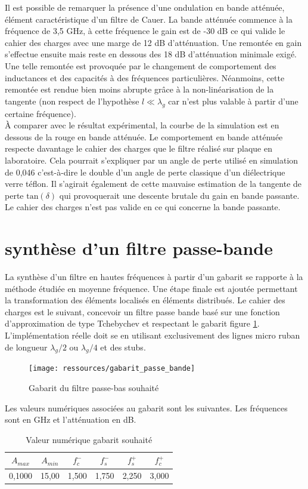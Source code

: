 \documentclass[french]{article}
\begin{document}
Il est possible de remarquer la présence d'une ondulation en bande atténuée, élément caractéristique d'un filtre de Cauer. La bande atténuée commence à la fréquence de 3,5 GHz, à cette fréquence le gain est de -30 dB ce qui valide le cahier des charges avec une marge de 12 dB d'atténuation. Une remontée en gain s'effectue ensuite mais reste en dessous des 18 dB d'atténuation minimale exigé. Une telle remontée est provoquée par le changement de comportement des inductances et des capacités à des fréquences particulières. Néanmoins, cette remontée est rendue bien moins abrupte grâce à la non-linéarisation de la tangente (non respect de l'hypothèse $l \ll \lambda_g$ car n'est plus valable à partir d'une certaine fréquence).\\
À comparer avec le résultat expérimental, la courbe de la simulation est en dessous de la rouge en bande atténuée. Le comportement en bande atténuée respecte davantage le cahier des charges que le filtre réalisé sur plaque en laboratoire. Cela pourrait s'expliquer par un angle de perte utilisé en simulation de 0,046 c'est-à-dire le double d'un angle de perte classique d'un diélectrique verre téflon. Il s'agirait également de cette mauvaise estimation de la tangente de perte $\mbox{tan}(\delta)$ qui provoquerait une descente brutale du gain en bande passante. Le cahier des charges n'est pas valide en ce qui concerne la bande passante.\\


\newpage

\section{synthèse d'un filtre passe-bande}

La synthèse d'un filtre en hautes fréquences à partir d'un gabarit se rapporte à la méthode étudiée en moyenne fréquence. Une étape finale est ajoutée permettant la transformation des éléments localisés en éléments distribués.
Le cahier des charges est le suivant, concevoir un filtre passe bande basé sur une fonction d'approximation de type Tchebychev et respectant le gabarit figure \ref{fig:gab}. L'implémentation réelle doit se en utilisant exclusivement des lignes micro ruban de longueur $\lambda_g/2$ ou $\lambda_g/4$ et des stubs.

\begin{figure}[H]
	\centering
	\texttt{[image: ressources/gabarit\_passe\_bande]}
	\caption{Gabarit du filtre passe-bas souhaité}
	\label{fig:gab}
\end{figure}
Les valeurs numériques associées au gabarit sont les suivantes. Les fréquences sont en GHz et l'atténuation en dB. 
	\begin{table}[H]
		\centering
\begin{tabular}{|c|c|c|c|c|c|}
		\hline
	$A_{max}$& $A_{min}$ & $f_c^-$ & $f_s^-$ & $f_s^+$ &$f_c^+$ \\ \hline
	0,1000	 & 15,00 		& 1,500	   & 1,750 & 2,250& 3,000 \\ \hline
	\end{tabular}
\caption{Valeur numérique gabarit souhaité}
	\end{table}
\end{document}
